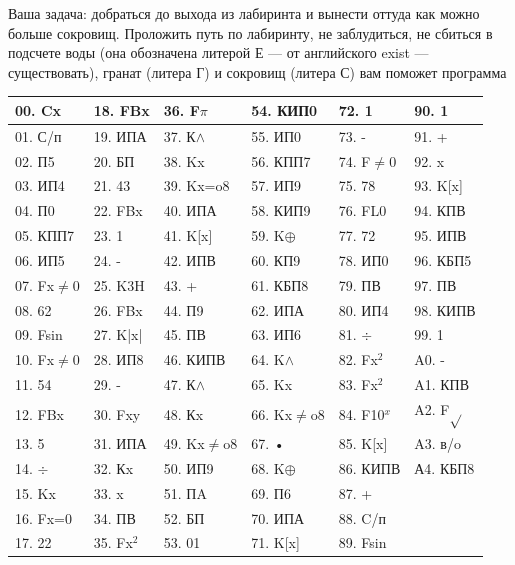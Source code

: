 \documentclass[11pt,a4paper,oneside]{article}
\begin{document}
Ваша задача: добраться до выхода из лабиринта и вынести оттуда как можно больше сокровищ. Проложить путь по лабиринту, не заблудиться, не сбиться в подсчете воды (она обозначена литерой Е — от английского exist — существовать), гранат (литера Г) и сокровищ (литера С) вам поможет программа

\begin{table}[]
\begin{tabular}{|l|l|l|l|l|l|}
\hline
00. Cx   & 18. FBx  & 36. F$\pi$ & 54. КИП0  & 72. 1        & 90. 1    \\ \hline
01. С/п  & 19. ИПА  & 37. К$\wedge$     & 55. ИП0   & 73. -        & 91. +    \\ \hline
02. П5   & 20. БП   & 38. K{x}   & 56. КПП7  & 74. F$\neq$0 & 92. x    \\ \hline
03. ИП4  & 21. 43   & 39. Kx=o8  & 57. ИП9   & 75. 78       & 93. K[x] \\ \hline
04. П0   & 22. FBx  & 40. ИПА    & 58. КИП9  & 76. FL0      & 94. КПВ  \\ \hline
05. КПП7 & 23. 1    & 41. K[x]   & 59. K$\oplus$    & 77. 72       & 95. ИПВ  \\ \hline
06. ИП5  & 24. -    & 42. ИПВ    & 60. КП9   & 78. ИП0      & 96. КБП5 \\ \hline
07. Fx$\neq$0 & 25. K3H  & 43. +      & 61. КБП8  & 79. ПВ       & 97. ПВ   \\ \hline
08. 62   & 26. FBx  & 44. П9     & 62. ИПА   & 80. ИП4      & 98. КИПВ \\ \hline
09. Fsin & 27. K|x| & 45. ПВ     & 63. ИП6   & 81. $\div$        & 99. 1    \\ \hline
10. Fx$\neq$0 & 28. ИП8  & 46. КИПВ   & 64. K$\wedge$    & 82. Fx$^{2}$      & A0. -    \\ \hline
11. 54   & 29. -    & 47. К$\wedge$     & 65. K{x}  & 83. Fx$^{2}$      & A1. КПВ  \\ \hline
12. FBx  & 30. Fxy  & 48. К{x}   & 66. Kx$\neq$o8 & 84. F10$^{x}$     & A2. F$\sqrt{}$   \\ \hline
13. 5    & 31. ИПА  & 49. Kx$\neq$o8  & 67. •     & 85. K[x]     & A3. в/o  \\ \hline
14. $\div$    & 32. К{x} & 50. ИП9    & 68. K$\oplus$    & 86. КИПВ     & А4. КБП8 \\ \hline
15. K{x} & 33. x    & 51. ПA     & 69. П6    & 87. +        &          \\ \hline
16. Fx=0 & 34. ПВ   & 52. БП     & 70. ИПА   & 88. C/п      &          \\ \hline
17. 22   & 35. Fx$^{2}$  & 53. 01     & 71. K[x]  & 89. Fsin     &          \\ \hline
\end{tabular}
\end{table}
\end{document}
